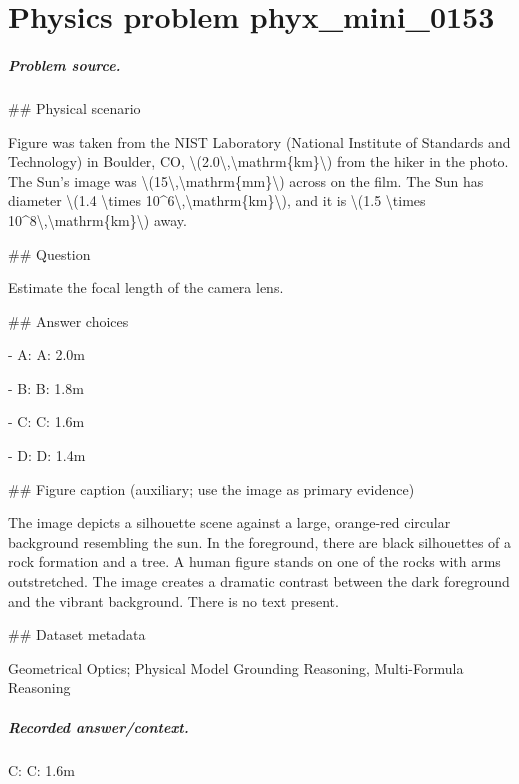 
\chapter{Physics problem phyx\_mini\_0153}
\label{ch:PhyXMiniProblems_problem_phyx_mini_0153}

\paragraph{Problem source.}
\#\# Physical scenario

Figure was taken from the NIST Laboratory (National Institute of Standards and Technology) in Boulder, CO, \textbackslash{}(2.0\textbackslash{},\textbackslash{}mathrm\{km\}\textbackslash{}) from the hiker in the photo. The Sun's image was \textbackslash{}(15\textbackslash{},\textbackslash{}mathrm\{mm\}\textbackslash{}) across on the film. The Sun has diameter \textbackslash{}(1.4 \textbackslash{}times 10\textasciicircum{}6\textbackslash{},\textbackslash{}mathrm\{km\}\textbackslash{}), and it is \textbackslash{}(1.5 \textbackslash{}times 10\textasciicircum{}8\textbackslash{},\textbackslash{}mathrm\{km\}\textbackslash{}) away.

\#\# Question

Estimate the focal length of the camera lens.

\#\# Answer choices

- A: A: 2.0m

- B: B: 1.8m

- C: C: 1.6m

- D: D: 1.4m

\#\# Figure caption (auxiliary; use the image as primary evidence)

The image depicts a silhouette scene against a large, orange-red circular background resembling the sun. In the foreground, there are black silhouettes of a rock formation and a tree. A human figure stands on one of the rocks with arms outstretched. The image creates a dramatic contrast between the dark foreground and the vibrant background. There is no text present.

\#\# Dataset metadata

Geometrical Optics; Physical Model Grounding Reasoning, Multi-Formula Reasoning

\paragraph{Recorded answer/context.}
C: C: 1.6m

